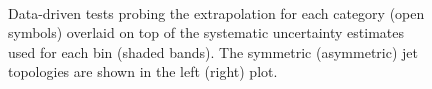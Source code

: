 \begin{figure}[h!]
  \begin{center}
    ~~
    \caption{Data-driven tests probing the \alphat extrapolation for each
      \njet category (open symbols) overlaid on top of the systematic
      uncertainty estimates used for each \scalht bin (shaded bands). 
      The symmetric (asymmetric) jet topologies are shown in the left (right) plot. 
    }
    \label{fig:closureAlphaT}
  \end{center} 
\end{figure}

